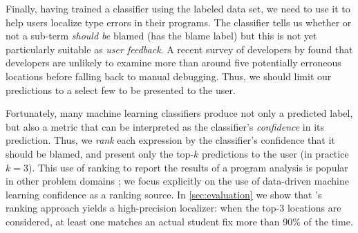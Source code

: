 


Finally, having trained a classifier
using the labeled data set, we need to use
it to help users localize type errors in
their programs.
%
The classifier tells us whether or not
a sub-term \emph{should be}
blamed (\ie has the blame label) but this
is not yet particularly suitable as
\emph{user feedback}.
%
A recent survey of developers by
\citet{Kochhar2016-oc} found that
developers are unlikely to examine
more than around five potentially
erroneous locations before falling
back to manual debugging.
%
Thus, we should limit our predictions
to a select few to be presented to
the user.

%
Fortunately, many machine learning
classifiers produce not only a predicted
label, but also a metric that can be
interpreted as the classifier's
\emph{confidence} in its prediction.
%
Thus, we \emph{rank} each expression
by the classifier's confidence that
it should be blamed, and present only
the top-$k$ predictions to the
user (in practice $k=3$).
%
This use of ranking to report the
results of a program analysis is
popular in other problem domains
\citep[see, \eg][]{Kremenek2003-ck};
we focus explicitly on the use of
data-driven machine learning
confidence as a ranking source.
%
In \autoref{sec:evaluation} we show
that \toolname's ranking approach
yields a high-precision localizer:
when the top-3 locations are considered,
at least one matches an actual student fix
more than 90\% of the time.




